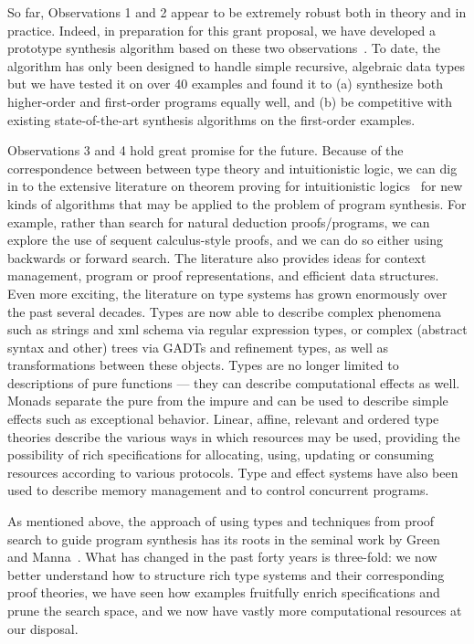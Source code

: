 So far, Observations 1 and 2 appear to be extremely robust both in theory and in
practice.  Indeed, in preparation for this grant proposal, we have
developed a prototype synthesis algorithm based on these two
observations~\cite{OZ15}.  
To date, the algorithm has only been designed to handle
simple recursive, algebraic data types but we have tested it on over 40
examples and found it to (a) synthesize both higher-order and
first-order programs equally well, and (b) be competitive with
existing state-of-the-art synthesis algorithms on the first-order
examples.  

Observations 3 and 4 hold great promise for the future. Because of the
correspondence between between type theory and intuitionistic logic,
we can dig in to the extensive literature on theorem proving for
intuitionistic logics~\cite{handbook-automated-reasoning} for new
kinds of algorithms that may be applied to the problem of program
synthesis.  For example, rather than search for natural deduction
proofs/programs, we can explore the use of sequent calculus-style
proofs, and we can do so either using backwards or forward search.
The literature also provides ideas for context management, program or
proof representations, and efficient data structures.  Even more
exciting, the literature on type systems has grown enormously over the
past several decades.  Types are now able to describe complex
phenomena such as strings and xml schema via regular expression types,
or complex (abstract syntax and other) trees via GADTs and refinement
types, as well as transformations between these objects.  Types are no
longer limited to descriptions of pure functions --- they can describe
computational effects as well.  Monads separate the pure from the
impure and can be used to describe simple effects such as exceptional
behavior.  Linear, affine, relevant and ordered type theories describe
the various ways in which resources may be used, providing the
possibility of rich specifications for allocating, using, updating or
consuming resources according to various protocols.  Type and effect
systems have also been used to describe memory management and to
control concurrent programs.

As mentioned above, the approach of using types and techniques from
proof search to guide program synthesis has its roots in the seminal
work by Green~\cite{green-ijcai-1969} and
Manna~\cite{manna-tse-1979,manna-plas-1980}.  What has changed in the
past forty years is three-fold: we now better understand how to
structure rich type systems and their corresponding proof theories, we
have seen how examples fruitfully enrich specifications and prune the
search space, and we now have vastly more computational resources at
our disposal.  

